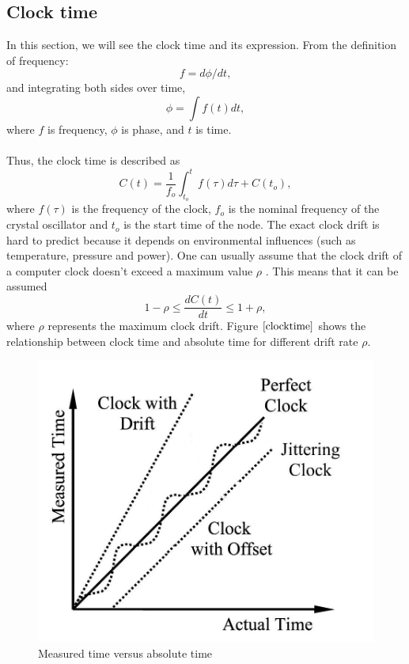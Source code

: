 \documentclass[a4paper,10pt]{report}
\begin{document}
\subsection{\textbf{Clock time}}
In this section, we will see the clock time and its expression. From the definition of frequency:
\begin{equation}
f = d\phi/dt \label{freq_defn} ,
\end{equation}
and integrating both sides over time,
 \begin{equation}
\phi =\int f(t)dt ,
 \end{equation}
where $f$ is frequency, $\phi$ is phase, and $t$ is time.\paragraph*{}
Thus, the clock time is described as
\begin{equation}
C(t) = \frac{1}{f_o}\int_{t_o}^{t} {f(\tau)d\tau} + C(t_o) ,
\label{clock}
\end{equation}
where $f(\tau)$ is the frequency of the clock, $f_o$ is the nominal frequency of the crystal oscillator and $t_o$ is the start time of
the node. The exact clock drift is hard to predict because it depends on environmental influences (such as temperature, pressure
and power). One can usually assume that the clock drift of a computer clock doesn't exceed a maximum value $\rho$ . This means
that it can be assumed
\begin{equation}
1-\rho \leq \frac{dC(t)}{dt} \leq 1+\rho ,
\end{equation}
where $\rho$ represents the maximum clock drift. Figure $\ref{clocktime}$ shows the relationship between clock time and absolute time for different drift rate $\rho$.
\begin{figure}
\centering
\includegraphics[width=0.5 \textwidth]{actualvsmeasuredtime}
\caption{Measured time versus absolute time} \label{clocktime}
\end{figure}
\end{document}
